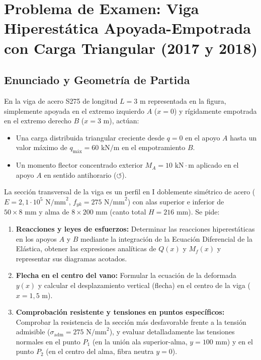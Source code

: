 \section{Problema de Examen: Viga Hiperestática Apoyada-Empotrada con Carga Triangular (2017 y 2018)}

\subsection{Enunciado y Geometría de Partida}

En la viga de acero S275 de longitud $L = 3\text{ m}$ representada en la figura, simplemente apoyada en el extremo izquierdo $A$ ($x = 0$) y rígidamente empotrada en el extremo derecho $B$ ($x = 3\text{ m}$), actúan:
\begin{itemize}
    \item Una carga distribuida triangular creciente desde $q = 0$ en el apoyo $A$ hasta un valor máximo de $q_{\text{máx}} = 60\text{ kN/m}$ en el empotramiento $B$.
    \item Un momento flector concentrado exterior $M_A = 10\text{ kN}\cdot\text{m}$ aplicado en el apoyo $A$ en sentido antihorario ($\circlearrowleft$).
\end{itemize}
La sección transversal de la viga es un perfil en I doblemente simétrico de acero ($E = 2{,}1 \cdot 10^5\text{ N/mm}^2$, $f_{yk} = 275\text{ N/mm}^2$) con alas superior e inferior de $50 \times 8\text{ mm}$ y alma de $8 \times 200\text{ mm}$ (canto total $H = 216\text{ mm}$). Se pide:

\begin{enumerate}[label=\alph*)]
    \item \textbf{Reacciones y leyes de esfuerzos:} Determinar las reacciones hiperestáticas en los apoyos $A$ y $B$ mediante la integración de la Ecuación Diferencial de la Elástica, obtener las expresiones analíticas de $Q(x)$ y $M_f(x)$ y representar sus diagramas acotados.
    \item \textbf{Flecha en el centro del vano:} Formular la ecuación de la deformada $y(x)$ y calcular el desplazamiento vertical (flecha) en el centro de la viga ($x = 1{,}5\text{ m}$).
    \item \textbf{Comprobación resistente y tensiones en puntos específicos:} Comprobar la resistencia de la sección más desfavorable frente a la tensión admisible ($\sigma_{\text{adm}} = 275\text{ N/mm}^2$), y evaluar detalladamente las tensiones normales en el punto $P_1$ (en la unión ala superior-alma, $y = 100\text{ mm}$) y en el punto $P_2$ (en el centro del alma, fibra neutra $y = 0$).
\end{enumerate}

